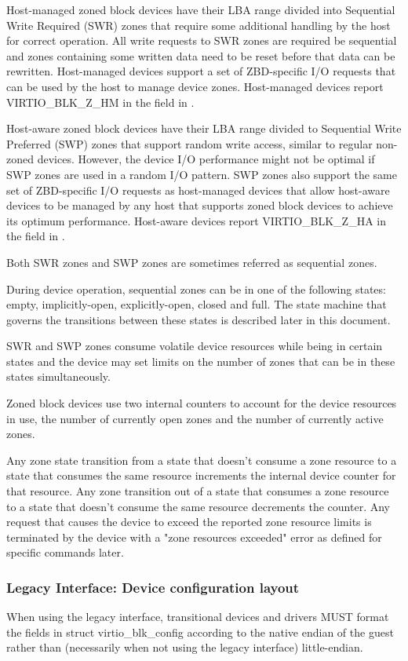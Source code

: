 Host-managed zoned block devices have their LBA range divided into Sequential
Write Required (SWR) zones that require some additional handling by the host
for correct operation. All write requests to SWR zones are required be
sequential and zones containing some written data need to be reset before that
data can be rewritten. Host-managed devices support a set of ZBD-specific I/O
requests that can be used by the host to manage device zones. Host-managed
devices report VIRTIO_BLK_Z_HM in the  field in .

Host-aware zoned block devices have their LBA range divided to Sequential
Write Preferred (SWP) zones that support random write access, similar to
regular non-zoned devices. However, the device I/O performance might not be
optimal if SWP zones are used in a random I/O pattern. SWP zones also support
the same set of ZBD-specific I/O requests as host-managed devices that allow
host-aware devices to be managed by any host that supports zoned block devices
to achieve its optimum performance. Host-aware devices report VIRTIO_BLK_Z_HA
in the  field in .

Both SWR zones and SWP zones are sometimes referred as sequential zones.

During device operation, sequential zones can be in one of the following states:
empty, implicitly-open, explicitly-open, closed and full. The state machine that
governs the transitions between these states is described later in this document.

SWR and SWP zones consume volatile device resources while being in certain
states and the device may set limits on the number of zones that can be in these
states simultaneously.

Zoned block devices use two internal counters to account for the device
resources in use, the number of currently open zones and the number of currently
active zones.

Any zone state transition from a state that doesn't consume a zone resource to a
state that consumes the same resource increments the internal device counter for
that resource. Any zone transition out of a state that consumes a zone resource
to a state that doesn't consume the same resource decrements the counter. Any
request that causes the device to exceed the reported zone resource limits is
terminated by the device with a "zone resources exceeded" error as defined for
specific commands later.

\subsubsection{Legacy Interface: Device configuration layout}\label{sec:Device Types / Block Device / Device configuration layout / Legacy Interface: Device configuration layout}
When using the legacy interface, transitional devices and drivers
MUST format the fields in struct virtio_blk_config
according to the native endian of the guest rather than
(necessarily when not using the legacy interface) little-endian.


